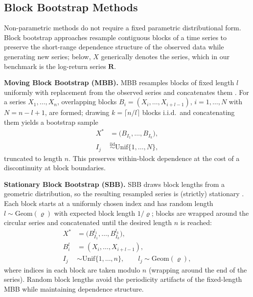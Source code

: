   \subsection{Block Bootstrap Methods}\label{sub:bootstrap-methods}
    Non-parametric methods do not require a fixed parametric
    distributional form. Block bootstrap approaches resample
    contiguous blocks of a time series to preserve the short-range
    dependence structure of the observed data while generating new
    series; below, \(X\) generically denotes the series, which in
    our benchmark is the log-return series \(\mathbf{R}\).
    \begin{enumerate}[label=\textbf{[A\arabic*]},resume]
      \item \label{alg:blockbootstrap2} \textbf{Moving Block Bootstrap
      (MBB).}
      MBB resamples blocks of fixed length \(l\) uniformly with
      replacement from the observed series and concatenates them
      \cite{Kunsch89}. For a series \(X_1,\dots,X_n\), overlapping
      blocks \(B_i = (X_i,\dots,X_{i+l-1})\), \(i=1,\dots,N\) with
      \(N = n - l + 1\), are formed; drawing \(k = \lceil n/l \rceil\)
      blocks i.i.d.\ and concatenating them yields a bootstrap sample
      \begin{equation}
        \begin{split}
          X^* &= \big(B_{I_1}, \dots, B_{I_k}\big), \\
          I_j &\overset{\mathrm{iid}}{\sim} \mathrm{Unif}\{1,\dots,N\},
        \end{split}
        \label{eq:mbb}
      \end{equation}
      truncated to length \(n\). This preserves within-block
      dependence at the cost of a discontinuity at block boundaries.

      \item \label{alg:sbb} \textbf{Stationary Block Bootstrap (SBB).}
      SBB draws block lengths from a geometric distribution, so the
      resulting resampled series is (strictly) stationary
      \cite{Politis94}. Each block starts at a uniformly chosen index
      and has random length \(l \sim \mathrm{Geom}(\varrho)\) with
      expected block length \(1/\varrho\); blocks are wrapped around
      the circular series and concatenated until the desired length
      \(n\) is reached:
      \begin{equation}
        \begin{split}
          X^* &= \big(B_{I_1}^{l_1}, \dots, B_{I_k}^{l_k}\big), \\
          B_i^l &= (X_{i}, \dots, X_{i+l-1}), \\
          I_j &\sim \mathrm{Unif}\{1,\dots,n\}, \qquad
          l_j \sim \mathrm{Geom}(\varrho),
        \end{split}
        \label{eq:sbb}
      \end{equation}
      where indices in each block are taken modulo \(n\) (wrapping
      around the end of the series). Random block lengths avoid the
      periodicity artifacts of the fixed-length MBB while maintaining
      dependence structure.
    \end{enumerate}
